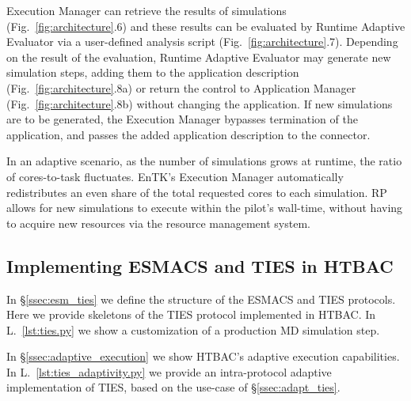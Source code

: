 Execution Manager can retrieve the results of simulations
(Fig.~\ref{fig:architecture}.6) and these results can be evaluated by Runtime
Adaptive Evaluator via a user-defined analysis script
(Fig.~\ref{fig:architecture}.7). Depending on the result of the evaluation,
Runtime Adaptive Evaluator may generate new simulation steps, adding them to
the application description (Fig.~\ref{fig:architecture}.8a) or return the
control to Application Manager (Fig.~\ref{fig:architecture}.8b) without
changing the application. If new simulations are to be generated, the
Execution Manager bypasses termination of the application, and passes the
added application description to the connector.


In an adaptive scenario, as the number of simulations grows at runtime, the
ratio of cores-to-task fluctuates. EnTK's Execution Manager automatically
redistributes an even share of the total requested cores to each simulation.
RP allows for new simulations to execute within the pilot's wall-time,
without having to acquire new resources via the resource management system.

\subsection{Implementing ESMACS and TIES in
HTBAC}\label{sec:implementation_htbac}

In \S\ref{ssec:esm_ties} we define the structure of the ESMACS and TIES
protocols. Here we provide skeletons of the TIES protocol implemented in
HTBAC\@. In L.~\ref{lst:ties.py} we show a customization of a production
MD simulation step.



In \S\ref{ssec:adaptive_execution} we show HTBAC's adaptive execution
capabilities. In L.~\ref{lst:ties_adaptivity.py} we provide an
intra-protocol adaptive implementation of TIES, based on the use-case
of \S\ref{ssec:adapt_ties}.



